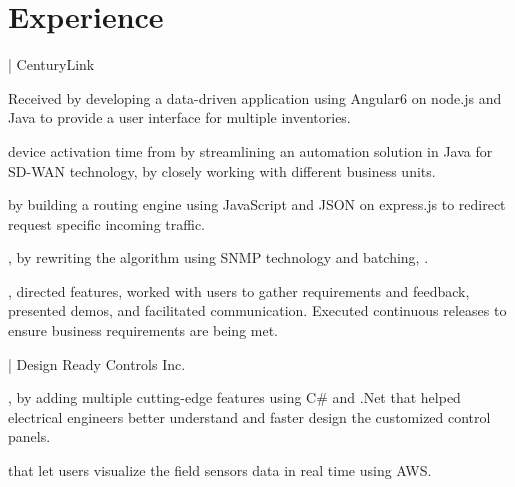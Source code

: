 \documentclass[]{rinkal_resume}
\begin{document}
%
%


\small


\section{Experience}
 | CenturyLink\hfill\   
\vspace{2pt}
\begin{tightemize}
\item Received  by developing a data-driven application using Angular6 on node.js and Java to provide a user interface for multiple inventories. 
\item {} device activation time from  by streamlining an automation solution in Java for SD-WAN technology, by closely working with different business units.
\item {} by building a routing engine using JavaScript and JSON on express.js to redirect request specific incoming traffic.
\item {}, by rewriting the algorithm using SNMP technology and batching, .
\item {}, directed features, worked with users to gather requirements and feedback, presented demos, and facilitated communication. Executed continuous releases to ensure business requirements are being met.
\end{tightemize}
\sectionsep

 | Design Ready Controls Inc. \hfill {}
\vspace{2pt}
\begin{tightemize}
\vspace{1pt}
\item {}, by adding multiple cutting-edge features using C\# and .Net that helped electrical engineers better understand and faster design the customized control panels.
\item {} that let users visualize the field sensors data in real time using AWS.
\end{tightemize}
\smallsectionsep
\end{document}
